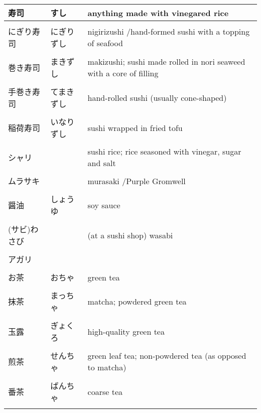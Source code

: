 \documentclass{article}
\begin{document}
\begin{tabular}{ l | l | p{11.5cm} }
寿司            &すし                           &anything made with vinegared rice \\ \hline \\[-1em]
にぎり寿司      &にぎりずし                     &nigirizushi /hand-formed sushi with a topping of seafood \\ \hline \\[-1em]
巻き寿司        &まきずし                       &makizushi; sushi made rolled in nori seaweed with a core of filling \\ \hline \\[-1em]
手巻き寿司      &てまきずし                     &hand-rolled sushi (usually cone-shaped) \\ \hline \\[-1em]
稲荷寿司        &いなりずし                     &sushi wrapped in fried tofu \\ \hline \\[-1em]
シャリ          &                               &sushi rice; rice seasoned with vinegar, sugar and salt \\ \hline \\[-1em]
ムラサキ        &                               &murasaki /Purple Gromwell \\ \hline \\[-1em]
醤油            &しょうゆ                       &soy sauce \\ \hline \\[-1em]
(サビ)わさび    &                               &(at a sushi shop) wasabi \\ \hline \\[-1em]
アガリ          &                               & \\ \hline \\[-1em]
お茶            &おちゃ                         &green tea \\ \hline \\[-1em]
抹茶            &まっちゃ                       &matcha; powdered green tea   \\ \hline \\[-1em]
玉露            &ぎょくろ                       &high-quality green tea  \\ \hline \\[-1em]
煎茶            &せんちゃ                       &green leaf tea; non-powdered tea (as opposed to matcha) \\ \hline \\[-1em]
番茶            &ばんちゃ                       &coarse tea \\ \hline \\[-1em]

\end{tabular}
\end{document}
